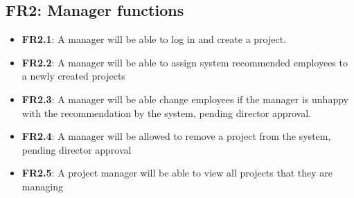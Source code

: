 \documentclass[]{article}
\begin{document}
	\subsection{FR2: Manager functions}
	\begin{itemize}
		\item \textbf{FR2.1}: A manager will be able to log in and create a project.
		
		\item \textbf{FR2.2}: A manager will be able to assign system recommended employees to a      newly created projects
		
		\item \textbf{FR2.3}: A manager will be able change employees if the manager is unhappy with     the recommendation by the system, pending director approval.
		
		\item \textbf{FR2.4}: A manager will be allowed to remove a project from the system, pending director approval
		
		\item \textbf{FR2.5}: A project manager will be able to view all projects that they are managing
	\end{itemize}
	
\end{document}
